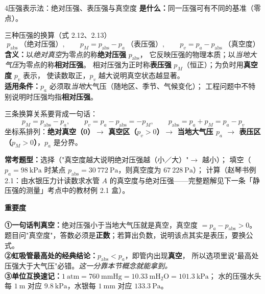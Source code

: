 \begin{kaodian}{4}{压强表示法：绝对压强、表压强与真空度}
\textbf{是什么：}同一压强可有不同的基准（零点）。

\begin{gongshi}{三种压强的换算（式 2.12、2.13）}
\[ p_{\text{abs}}\ \text{（绝对压强）},\qquad
   p_M=p_{\text{abs}}-p_a\ \text{（表压强）},\qquad
   p_v=p_a-p_{\text{abs}}\ \text{（真空度）} \]
\textbf{含义：}以\emph{绝对真空}为零点的称\textbf{绝对压强} $p_{\text{abs}}$，
它反映压强的物理本质；以\emph{当地大气压}为零点的称\textbf{相对压强}。
相对压强为正时称\textbf{表压强} $p_M$（恒正）；为负时用\textbf{真空度} $p_v$ 表示，
使读数取正，$p_v$ 越大说明真空状态越显著。\\
\textbf{适用条件：}$p_a$ 必须取\emph{当地}大气压（随地区、季节、气候变化）；
工程问题中不特别说明时压强均指\textbf{相对压强}。
\end{gongshi}

三条换算关系要背成一句话：
\[ p_M=p_{\text{abs}}-p_a,\qquad p_v=p_a-p_{\text{abs}}=-p_M,\qquad
   p_{\text{abs}}=p_a+p_M=p_a-p_v \]
坐标系排列：\textbf{绝对真空（0）$\to$ 真空区（$p_v>0$）$\to$ 当地大气压 $p_a$ $\to$
表压区（$p_M>0$）}，$p_a$ 是分界。

\textbf{常考题型：}选择（"真空度越大说明绝对压强越（小／大）"$\to$ 越小）；
填空（$p_a=98\ \mathrm{kPa}$ 时某点 $p_{\text{abs}}=30\ 772\ \mathrm{Pa}$，则真空度为 $67\ 228\ \mathrm{Pa}$）；
计算（赵琴书例 2.1：由水银压力计读数求水管 $A$ 的真空度与绝对压强——完整题解见下一条「静压强的测量」考点中的教材例 2.1 盒）。

\textbf{重要度 }\quad{}\quad{}

\begin{banfa}
\textbf{①一句话判真空：}绝对压强小于当地大气压就是真空，真空度 $=p_a-p_{\text{abs}}>0$。
题目问"真空度"，答数必须是\textbf{正数}；若算出负数，说明该点其实是表压，要换公式。\\
\textbf{②虹吸管最高处的经典结论：}$p_{\text{abs}}<p_a$，即管内出现\textbf{真空}，
所以选项里说"最高处压强大于大气压"必错。\emph{这一分靠本节概念就能拿到。}\\
\textbf{③单位互换速记：}$1\ \mathrm{atm}=760\ \mathrm{mmHg}=10.33\ \mathrm{mH_2O}=101.3\ \mathrm{kPa}$；
水的压强水头每 $1\ \mathrm{m}$ 对应 $9.8\ \mathrm{kPa}$，水银每 $1\ \mathrm{mm}$ 对应 $133.3\ \mathrm{Pa}$。
\end{banfa}
\end{kaodian}

